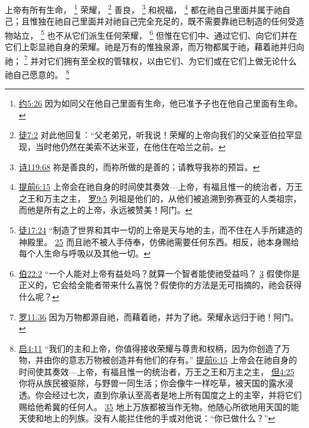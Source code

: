 \documentclass[12pt, a4paper, oneside]{ctexart}
\newcounter{parnum}[section]
\newcommand{\N}{%
   \noindent\refstepcounter{parnum}%
    \makebox[\parindent][l]{\textbf{\arabic{parnum}.}}}
\begin{document}
\N 上帝有所有生命，
	\footnote {
		\href{https://biblehub.com/john/5-26.htm}{约5:26} 因为如同父在他自己里面有生命，他已准予子也在他自己里面有生命。
	}
	荣耀，
	\footnote {
		\href{https://biblehub.com/acts/7-2.htm}{徒7:2} 对此他回复：“父老弟兄，听我说！荣耀的上帝向我们的父亲亚伯拉罕显现，当时他仍然在美索不达米亚，在他住在哈兰之前。
	}
	善良，
	\footnote {
		\href{https://biblehub.com/psalms/119-68.htm}{诗119:68} 祢是善良的，而祢所做的是善的；请教导我祢的预旨。
	}
	和祝福，
	\footnote {
		\href{https://biblehub.com/1_timothy/6-15.htm}{提前6:15} 上帝会在祂自身的时间使其奏效---上帝，有福且惟一的统治者，万王之王和万主之主，
		\href{https://biblehub.com/romans/9-5.htm}{罗9:5} 列祖是他们的，从他们被追溯到弥赛亚的人类祖宗，而他是所有之上的上帝，永远被赞美！阿门。
	}
	都在祂自己里面并属于祂自己；且惟独在祂自己里面并对祂自己完全充足的，既不需要靠祂已制造的任何受造物站立，
	\footnote {
		\href{https://biblehub.com/acts/17-24.htm}{徒17:24} “制造了世界和其中一切的上帝是天与地的主，而不住在人手所建造的神殿里。
		\href{https://biblehub.com/acts/17-25.htm}{25} 而且祂不被人手侍奉，仿佛祂需要任何东西。相反，祂本身赐给每个人生命与呼吸以及其他一切。
	}
	也不从它们派生任何荣耀，
	\footnote {
		\href{https://biblehub.com/job/22-2.htm}{伯22:2} “一个人能对上帝有益处吗？就算一个智者能使祂受益吗？
		\href{https://biblehub.com/job/22-3.htm}{3} 假使你是正义的，它会给全能者带来什么喜悦？假使你的方法是无可指摘的，祂会获得什么呢？
	}
	但惟在它们中、通过它们、向它们并在它们上彰显祂自身的荣耀。祂是万有的惟独泉源，而万物都属于祂，藉着祂并归向祂；
	\footnote {
		\href{https://biblehub.com/romans/11-36.htm}{罗11:36} 因为万物都源自祂，而藉着祂，并为了祂。荣耀永远归于祂！阿门。
	}
	并对它们拥有至全权的管辖权，以由它们、为它们或在它们上做无论什么祂自己愿意的。
	\footnote {
		\href{https://biblehub.com/revelation/4-11.htm}{启4:11} “我们的主和上帝，你值得接收荣耀与尊贵和权柄，因为你创造了万物，并由你的意志万物被创造并有他们的存有。”
		\href{https://biblehub.com/1_timothy/6-15.htm}{提前6:15} 上帝会在祂自身的时间使其奏效---上帝，有福且惟一的统治者，万王之王和万主之主，
		\href{https://biblehub.com/daniel/4-25.htm}{但4:25} 你将从族民被驱除，与野兽一同生活；你会像牛一样吃草，被天国的露水浸透。你会经过七次，直到你承认至高者是地上所有国度之上的主宰，并将它们赐给他希冀的任何人。
		\href{https://biblehub.com/daniel/4-35.htm}{35} 地上万族都被当作无物。他随心所欲地用天国的能天使和地上的列族。没有人能拦住他的手或对他说：“你已做什么？”
	}
\end{document}
